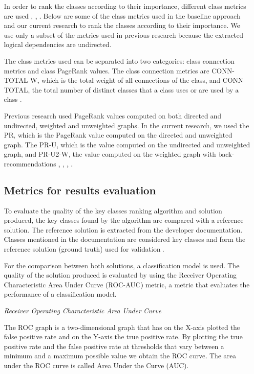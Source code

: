 \documentclass[runningheads]{comsis2}
\begin{document}
In order to rank the classes according to their importance, different class metrics are used \cite{Ding2016AnIA}, \cite{ZaidmanJurnal}, \cite{PAN2018188}. Below are some of the class metrics used in the baseline approach and our current research to rank the classes according to their importance. We use only a subset of the metrics used in previous research because the extracted logical dependencies are undirected.


The class metrics used can be separated into two categories: class connection metrics and class PageRank values.
The class connection metrics are CONN-TOTAL-W, which is the total weight of all connections of the class, and CONN-TOTAL, the total number of distinct classes that a class uses or are used by a class \cite{Finding-key-classes}.

Previous research used PageRank values computed on both directed and undirected, weighted and unweighted graphs. In the current research, we used the PR, which is the PageRank value computed on the directed and unweighted graph. The PR-U, which is the value computed on the undirected and unweighted graph, and PR-U2-W, the value computed on the weighted graph with back-recommendations \cite{PagerankENASE}, \cite{enase15}, \cite{Finding-key-classes}, \cite{PagerankSACI}.




\subsection{Metrics for results evaluation}
\label{sec:evalmetrics}
To evaluate the quality of the key classes ranking algorithm and solution produced, the key classes found by the algorithm are compared with a reference solution. The reference solution is extracted from the developer documentation.  Classes mentioned in the documentation are considered key classes and form the reference solution (ground truth) used for validation \cite{7551990}. 

For the comparison between both solutions, a classification model is used. The quality of the solution produced is evaluated by using the Receiver Operating Characteristic Area Under Curve (ROC-AUC) metric, a metric that evaluates the performance of a classification model.


\textit{Receiver Operating Characteristic Area Under Curve}


The ROC graph is a two-dimensional graph that has on the X-axis plotted the false positive rate and on the Y-axis the true positive rate. By plotting the true positive rate and the false positive rate at thresholds that vary between a minimum and a maximum possible value we obtain the ROC curve. The area under the ROC curve is called Area Under the Curve (AUC).
\end{document}
